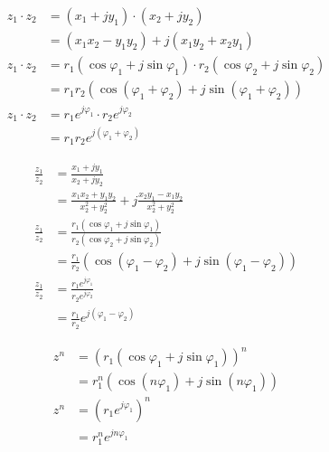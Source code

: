 \begin{boxleft}
\end{boxleft}\begin{boxrightshaded}
\begin{align} 
 z_1 \cdot z_2&=(x_1+jy_1)\cdot(x_2+jy_2)\\
	      &=(x_1x_2-y_1y_2)+ j(x_1y_2+x_2y_1)\\
 z_1 \cdot z_2&=r_1\left(\cos{\varphi_1}+j\sin{\varphi_1}\right)\cdot r_2\left(\cos{\varphi_2}+j\sin{\varphi_2}\right)\\
	      &=r_1r_2\left(\cos(\varphi_1+\varphi_2)+j\sin(\varphi_1+\varphi_2)\right)\\
 z_1 \cdot z_2&=r_1e^{j\varphi_1}\cdot r_2e^{j\varphi_2}\\
	      &=r_1r_2e^{j(\varphi_1+\varphi_2)}
\end{align}\end{boxrightshaded}

\begin{boxleft}
\end{boxleft}\begin{boxrightshaded}
\begin{align} 
\frac{z_1}{z_2} &=\frac{x_1+jy_1}{x_2+jy_2}\\
		&=\frac{x_1x_2+y_1y_2}{x_2^2+y_2^2}+j\frac{x_2y_1-x_1y_2}{x_2^2+y_2^2}\\
\frac{z_1}{z_2} &=\frac{r_1\left(\cos{\varphi_1}+j\sin{\varphi_1}\right)}{r_2\left(\cos{\varphi_2}+j\sin{\varphi_2}\right)}\\
	        &=\frac{r_1}{r_2}\left(\cos(\varphi_1-\varphi_2)+j\sin(\varphi_1-\varphi_2)\right)\\
\frac{z_1}{z_2} &=\frac{r_1e^{j\varphi_1}}{r_2e^{j\varphi_2}}\\
	        &=\frac{r_1}{r_2}e^{j(\varphi_1-\varphi_2)}
\end{align}\end{boxrightshaded}

\begin{boxleft}
\end{boxleft}\begin{boxrightshaded}
\begin{align} 
z^n		&=\left(r_1\left(\cos{\varphi_1}+j\sin{\varphi_1}\right)\right)^n\\
		&=r_1^n\left(\cos(n\varphi_1)+j\sin(n\varphi_1)\right)\\
z^n		&=\left(r_1e^{j\varphi_1}\right)^n\\
		&=r_1^ne^{jn\varphi_1}
\end{align}\end{boxrightshaded}

